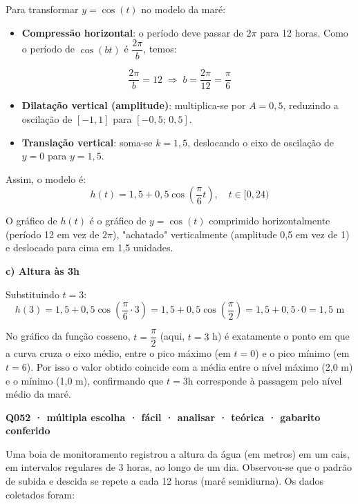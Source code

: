 \documentclass[11pt,a4paper]{article}
\begin{document}
Para transformar $y=\cos(t)$ no modelo da maré:

\begin{itemize}[nosep,leftmargin=*]
\item \textbf{Compressão horizontal}: o período deve passar de $2\pi$ para 12 horas. Como o período de $\cos(bt)$ é $\dfrac{2\pi}{b}$, temos:
\end{itemize}
$$\frac{2\pi}{b} = 12 \;\Rightarrow\; b = \frac{2\pi}{12} = \frac{\pi}{6}$$

\begin{itemize}[nosep,leftmargin=*]
\item \textbf{Dilatação vertical (amplitude)}: multiplica-se por $A = 0{,}5$, reduzindo a oscilação de $[-1,1]$ para $[-0{,}5;\,0{,}5]$.
\end{itemize}

\begin{itemize}[nosep,leftmargin=*]
\item \textbf{Translação vertical}: soma-se $k=1{,}5$, deslocando o eixo de oscilação de $y=0$ para $y=1{,}5$.
\end{itemize}

Assim, o modelo é:
$$h(t) = 1{,}5 + 0{,}5\cos\!\left(\frac{\pi}{6}t\right), \quad t \in [0,24)$$

O gráfico de $h(t)$ é o gráfico de $y=\cos(t)$ comprimido horizontalmente (período 12 em vez de $2\pi$), "achatado" verticalmente (amplitude 0,5 em vez de 1) e deslocado para cima em 1,5 unidades.

\textbf{c) Altura às 3h}

Substituindo $t=3$:
$$h(3) = 1{,}5 + 0{,}5\cos\!\left(\frac{\pi}{6}\cdot 3\right) = 1{,}5 + 0{,}5\cos\!\left(\frac{\pi}{2}\right) = 1{,}5 + 0{,}5\cdot 0 = 1{,}5 \text{ m}$$

No gráfico da função cosseno, $t=\dfrac{\pi}{2}$ (aqui, $t=3$ h) é exatamente o ponto em que a curva cruza o eixo médio, entre o pico máximo (em $t=0$) e o pico mínimo (em $t=6$). Por isso o valor obtido coincide com a média entre o nível máximo (2,0 m) e o mínimo (1,0 m), confirmando que $t=3$h corresponde à passagem pelo nível médio da maré.

\bigskip\noindent\textbf{Q052 · múltipla escolha · fácil · analisar · teórica · gabarito conferido}\par\nopagebreak
Uma boia de monitoramento registrou a altura da água (em metros) em um cais, em intervalos regulares de 3 horas, ao longo de um dia. Observou-se que o padrão de subida e descida se repete a cada 12 horas (maré semidiurna). Os dados coletados foram:
\end{document}
